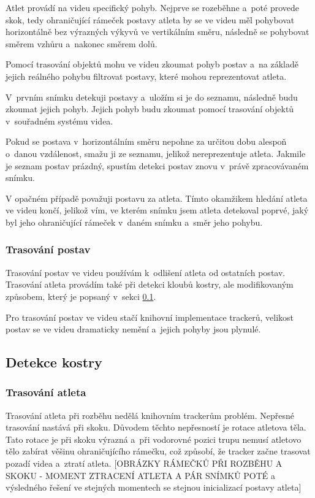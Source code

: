 Atlet provádí na videu specifický pohyb. Nejprve se rozeběhne a~poté provede skok, tedy ohraničující rámeček postavy atleta by se ve videu měl pohybovat horizontálně bez výrazných výkyvů ve vertikálním směru, následně se pohybovat směrem vzhůru a~nakonec směrem dolů.

Pomocí trasování objektů mohu ve videu zkoumat pohyb postav a~na základě jejich reálného pohybu filtrovat postavy, které mohou reprezentovat atleta.

V~prvním snímku detekuji postavy a~uložím si je do seznamu, následně budu zkoumat jejich pohyb. Jejich pohyb budu zkoumat pomocí trasování objektů v~souřadném systému videa.

Pokud se postava v~horizontálním směru nepohne za určitou dobu alespoň o~danou vzdálenost, smažu ji ze seznamu, jelikož nereprezentuje atleta. Jakmile je seznam postav prázdný, spustím detekci postav znovu v~právě zpracovávaném snímku.

V opačném případě považuji postavu za atleta. Tímto okamžikem hledání atleta ve videu končí, jelikož vím, ve kterém snímku jsem atleta detekoval poprvé, jaký byl jeho ohraničující rámeček v~daném snímku a~směr jeho pohybu.


\subsubsection{Trasování postav}

Trasování postav ve videu používám k~odlišení atleta od ostatních postav. Trasování atleta provádím také při detekci kloubů kostry, ale modifikovaným způsobem, který je popsaný v~sekci \ref{ssec:detekce}.

Pro trasování postav ve videu stačí knihovní implementace trackerů, velikost postav se ve videu dramaticky nemění a~jejich pohyby jsou plynulé.



\subsection{Detekce kostry}
\label{ssec:detekce}

\subsubsection{Trasování atleta}

Trasování atleta při rozběhu nedělá knihovním trackerům problém. Nepřesné trasování nastává při skoku. Důvodem těchto nepřesností je rotace atletova těla. Tato rotace je při skoku výrazná a~při vodorovné pozici trupu nemusí atletovo tělo zabírat věšinu ohraničujícího rámečku, což způsobí, že tracker začne trasovat pozadí videa a~ztratí atleta. [OBRÁZKY RÁMEČKŮ PŘI ROZBĚHU A SKOKU - MOMENT ZTRACENÍ ATLETA A PÁR SNÍMKŮ POTÉ a výsledného řešení ve stejných momentech se stejnou inicializací postavy atleta]

